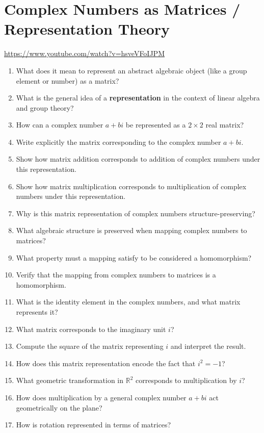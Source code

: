 \section{Complex Numbers as Matrices / Representation Theory}

\url{https://www.youtube.com/watch?v=hsveVFoIJPM}

\begin{enumerate}
  \item What does it mean to represent an abstract algebraic object (like a group element or number) as a matrix?
  \item What is the general idea of a \textbf{representation} in the context of linear algebra and group theory?
  \item How can a complex number \(a + bi\) be represented as a \(2 \times 2\) real matrix?
  \item Write explicitly the matrix corresponding to the complex number \(a + bi\).
  \item Show how matrix addition corresponds to addition of complex numbers under this representation.
  \item Show how matrix multiplication corresponds to multiplication of complex numbers under this representation.
  \item Why is this matrix representation of complex numbers structure-preserving?
  \item What algebraic structure is preserved when mapping complex numbers to matrices?
  \item What property must a mapping satisfy to be considered a homomorphism?
  \item Verify that the mapping from complex numbers to matrices is a homomorphism.
  \item What is the identity element in the complex numbers, and what matrix represents it?
  \item What matrix corresponds to the imaginary unit \(i\)?
  \item Compute the square of the matrix representing \(i\) and interpret the result.
  \item How does this matrix representation encode the fact that \(i^{2} = -1\)?
  \item What geometric transformation in \(\mathbb{R}^{2}\) corresponds to multiplication by \(i\)?
  \item How does multiplication by a general complex number \(a + bi\) act geometrically on the plane?
  \item How is rotation represented in terms of matrices?

\end{enumerate}

